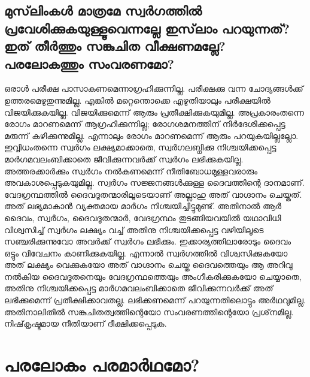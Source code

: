   \section{മുസ്‌ലിംകള്‍ മാത്രമേ സ്വര്‍ഗത്തില്‍ പ്രവേശിക്കുകയുള്ളൂവെന്നല്ലേ ഇസ്‌ലാം പറയുന്നത്? ഇത് തീര്‍ത്തും സങ്കുചിത വീക്ഷണമല്ലേ? പരലോകത്തും സംവരണമോ?}
 ഒരാള്‍ പരീക്ഷ പാസാകണമെന്നാഗ്രഹിക്കുന്നില്ല. പരീക്ഷക്കു വന്ന ചോദ്യങ്ങള്‍ക്ക് ഉത്തരമെഴുതുന്നുമില്ല. എങ്കില്‍ മറ്റെന്തൊക്കെ എഴുതിയാലും പരീക്ഷയില്‍ വിജയിക്കുകയില്ല. വിജയിക്കുമെന്ന് ആരും പ്രതീക്ഷിക്കുകയുമില്ല. അപ്രകാരംതന്നെ രോഗം മാറണമെന്ന് ആഗ്രഹിക്കുന്നില്ല; രോഗശമനത്തിന് നിര്‍ദേശിക്കപ്പെട്ട മരുന്ന് കഴിക്കുന്നുമില്ല. എന്നാലും രോഗം മാറണമെന്ന് ആരും പറയുകയില്ലല്ലോ. ഇവ്വിധംതന്നെ സ്വര്‍ഗം ലക്ഷ്യമാക്കാതെ, സ്വര്‍ഗലബ്ധിക്കു നിശ്ചയിക്കപ്പെട്ട മാര്‍ഗമവലംബിക്കാതെ ജീവിക്കുന്നവര്‍ക്ക് സ്വര്‍ഗം ലഭിക്കുകയില്ല. അത്തരക്കാര്‍ക്കും സ്വര്‍ഗം നല്‍കണമെന്ന് നീതിബോധമുള്ളവരാരും അവകാശപ്പെടുകയുമില്ല.
സ്വര്‍ഗം സജ്ജനങ്ങള്‍ക്കുള്ള ദൈവത്തിന്റെ ദാനമാണ്. വേദഗ്രന്ഥത്തില്‍ ദൈവദൂതന്മാരിലൂടെയാണ് അല്ലാഹു അത് വാഗ്ദാനം ചെയ്തത്. അത് ലഭ്യമാകാന്‍ വ്യക്തമായ മാര്‍ഗം നിശ്ചയിച്ചിട്ടുമുണ്ട്. അതിനാല്‍ ആര്‍ ദൈവം, സ്വര്‍ഗം, ദൈവദൂതന്മാര്‍, വേദഗ്രന്ഥം തുടങ്ങിയവയില്‍ യഥാവിധി വിശ്വസിച്ച് സ്വര്‍ഗം ലക്ഷ്യം വച്ച് അതിനു നിശ്ചയിക്കപ്പെട്ട വഴിയിലൂടെ സഞ്ചരിക്കുന്നുവോ അവര്‍ക്ക് സ്വര്‍ഗം ലഭിക്കും. ഇക്കാര്യത്തിലാരോടും ദൈവം ഒട്ടും വിവേചനം കാണിക്കുകയില്ല. എന്നാല്‍ സ്വര്‍ഗത്തില്‍ വിശ്വസിക്കുകയോ അത് ലക്ഷ്യം വെക്കുകയോ അത് വാഗ്ദാനം ചെയ്ത ദൈവത്തെയും ആ അറിവു നല്‍കിയ ദൈവദൂതനെയും വേദഗ്രന്ഥത്തെയും അംഗീകരിക്കുകയോ ചെയ്യാതെ, അതിനു നിശ്ചയിക്കപ്പെട്ട മാര്‍ഗമവലംബിക്കാതെ ജീവിക്കുന്നവര്‍ക്ക് അത് ലഭിക്കുമെന്ന് പ്രതീക്ഷിക്കാവതല്ല. ലഭിക്കണമെന്ന് പറയുന്നതിലൊട്ടും അര്‍ഥവുമില്ല. അതിനാലിതില്‍ സങ്കുചിതത്വത്തിന്റെയോ സംവരണത്തിന്റെയോ പ്രശ്‌നമില്ല. നിഷ്‌കൃഷ്ടമായ നീതിയാണ് ദീക്ഷിക്കപ്പെടുക.
\chapter{പരലോകം പരമാര്‍ഥമോ? }
